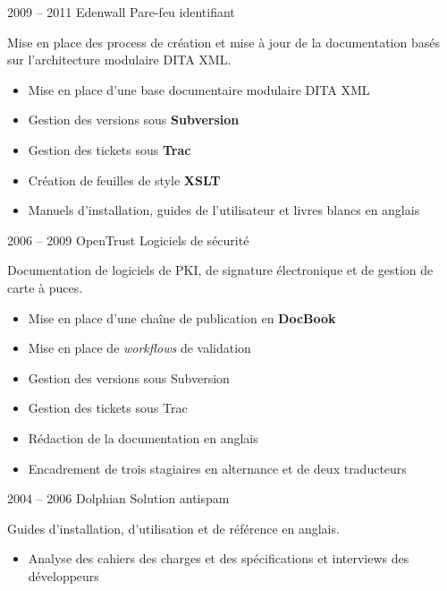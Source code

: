 \documentclass[11pt,a4paper,roman]{moderncv}
\begin{document}

\cventry
    {2009 – 2011}
    {Edenwall}
    {Pare-feu identifiant}
    {}
    {}
    {Mise en place des process de création et mise à jour de la documentation
      basés sur l'architecture modulaire DITA XML.
      \begin{itemize}
      \item Mise en place d'une base documentaire modulaire DITA XML
      \item Gestion des versions sous \textbf{Subversion}
      \item Gestion des tickets sous \textbf{Trac}
      \item Création de feuilles de style \textbf{XSLT}
      \item Manuels d'installation, guides de l'utilisateur et livres blancs en
        anglais
    \end{itemize}}


\cventry
    {2006 – 2009}
    {OpenTrust}
    {Logiciels de sécurité}
    {}
    {}
    {Documentation de logiciels de PKI, de signature électronique et
      de gestion de carte à puces.
      \begin{itemize}
      \item Mise en place d'une chaîne de publication en \textbf{DocBook}
      \item Mise en place de \textit{workflows} de validation
      \item Gestion des versions sous Subversion
      \item Gestion des tickets sous Trac
      \item Rédaction de la documentation en anglais
      \item Encadrement de trois stagiaires en alternance et de deux traducteurs
    \end{itemize}}


\cventry
    {2004 – 2006}
    {Dolphian}
    {Solution antispam}
    {}
    {}
    {Guides d'installation, d'utilisation et de référence en anglais.
      \begin{itemize}
      \item Analyse des cahiers des charges et des spécifications et interviews
        des développeurs
    \end{itemize}}

\end{document}

